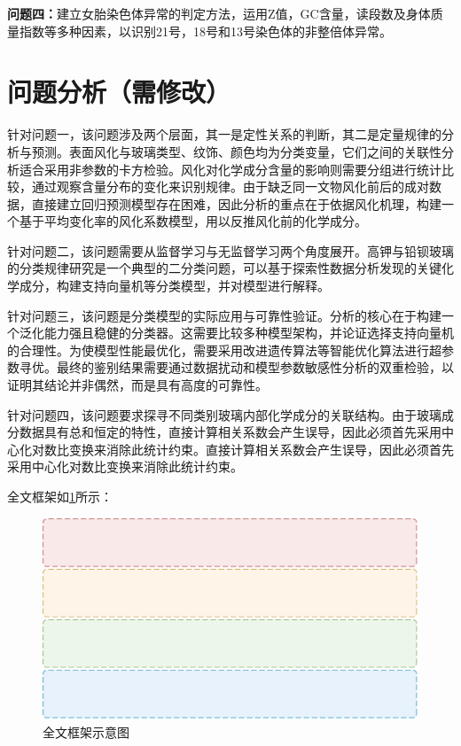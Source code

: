 \textbf{问题四：}建立女胎染色体异常的判定方法，运用Z值，GC含量，读段数及身体质量指数等多种因素，以识别21号，18号和13号染色体的非整倍体异常。


\section{问题分析（需修改）}

针对问题一，该问题涉及两个层面，其一是定性关系的判断，其二是定量规律的分析与预测。表面风化与玻璃类型、纹饰、颜色均为分类变量，它们之间的关联性分析适合采用非参数的卡方检验。风化对化学成分含量的影响则需要分组进行统计比较，通过观察含量分布的变化来识别规律。由于缺乏同一文物风化前后的成对数据，直接建立回归预测模型存在困难，因此分析的重点在于依据风化机理，构建一个基于平均变化率的风化系数模型，用以反推风化前的化学成分。

针对问题二，该问题需要从监督学习与无监督学习两个角度展开。高钾与铅钡玻璃的分类规律研究是一个典型的二分类问题，可以基于探索性数据分析发现的关键化学成分，构建支持向量机等分类模型，并对模型进行解释。

针对问题三，该问题是分类模型的实际应用与可靠性验证。分析的核心在于构建一个泛化能力强且稳健的分类器。这需要比较多种模型架构，并论证选择支持向量机的合理性。为使模型性能最优化，需要采用改进遗传算法等智能优化算法进行超参数寻优。最终的鉴别结果需要通过数据扰动和模型参数敏感性分析的双重检验，以证明其结论并非偶然，而是具有高度的可靠性。

针对问题四，该问题要求探寻不同类别玻璃内部化学成分的关联结构。由于玻璃成分数据具有总和恒定的特性，直接计算相关系数会产生误导，因此必须首先采用中心化对数比变换来消除此统计约束。直接计算相关系数会产生误导，因此必须首先采用中心化对数比变换来消除此统计约束。

全文框架如\cref{fig:全文框架}所示：

\begin{figure}[H]
	\centering
	\includegraphics[width=\textwidth]{figs/1前置/全文框架.pdf}
	\caption{全文框架示意图}
	\label{fig:全文框架}
\end{figure}



